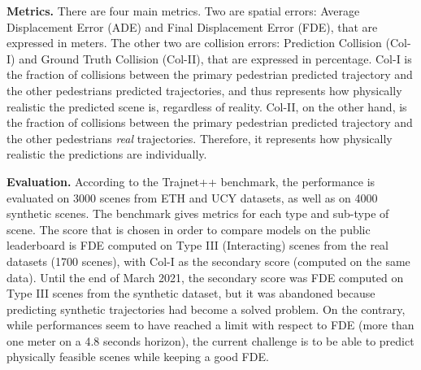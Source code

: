\documentclass[conference]{IEEEtran}
\newcommand{\block}{\textbf}
\begin{document}
\block{Metrics.} There are four main metrics. Two are spatial errors: Average Displacement Error (ADE) and Final Displacement Error (FDE), that are expressed in meters. The other two are collision errors: Prediction Collision (Col-I) and Ground Truth Collision (Col-II), that are expressed in percentage. Col-I is the fraction of collisions between the primary pedestrian predicted trajectory and the other pedestrians predicted trajectories, and thus represents how physically realistic the predicted scene is, regardless of reality. Col-II, on the other hand, is the fraction of collisions between the primary pedestrian predicted trajectory and the other pedestrians \textit{real} trajectories. Therefore, it represents how physically realistic the predictions are individually.

\block{Evaluation.} According to the Trajnet++ benchmark, the performance is evaluated on 3000 scenes from ETH and UCY datasets, as well as on 4000 synthetic scenes. The benchmark gives metrics for each type and sub-type of scene. The score that is chosen in order to compare models on the public leaderboard is FDE computed on Type III (Interacting) scenes from the real datasets (1700 scenes), with Col-I as the secondary score (computed on the same data). Until the end of March 2021, the secondary score was FDE computed on Type III scenes from the synthetic dataset, but it was abandoned because predicting synthetic trajectories had become a solved problem. On the contrary, while performances seem to have reached a limit with respect to FDE (more than one meter on a 4.8 seconds horizon), the current challenge is to be able to predict physically feasible scenes while keeping a good FDE.
\end{document}
